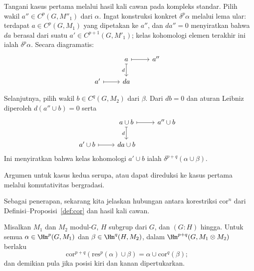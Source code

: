 \begin{bukti}
	Tangani kasus pertama melalui hasil kali cawan pada kompleks standar. Pilih
	wakil $a''\in C^p(G,M''_1)$ dari $\alpha$. Ingat konstruksi konkret
	$\delta^p\alpha$ melalui lema ular: terdapat $a\in C^p(G,M_1)$ yang
	dipetakan ke $a''$, dan $da''=0$ menyiratkan bahwa $da$ berasal dari suatu
	$a'\in C^{p+1}(G,M'_1)$; kelas kohomologi elemen terakhir ini ialah
	$\delta^p\alpha$. Secara diagramatis:
	\[\begin{tikzcd}
		& a \arrow[mapsto, r] \arrow[mapsto, d, "d"'] & a'' \\
		a' \arrow[mapsto, r] & da &
	\end{tikzcd}\]

	Selanjutnya, pilih wakil $b\in C^q(G,M_2)$ dari $\beta$. Dari $db=0$ dan
	aturan Leibniz diperoleh $d(a''\cup b)=0$ serta
	\[\begin{tikzcd}
		& a \cup b \arrow[mapsto, r] \arrow[mapsto, d, "d"'] & a'' \cup b \\
		a' \cup b \arrow[mapsto, r] & da \cup b &
	\end{tikzcd}\]
	Ini menyiratkan bahwa kelas kohomologi $a'\cup b$ ialah
	$\delta^{p+q}(\alpha\cup\beta)$.

	Argumen untuk kasus kedua serupa, atau dapat direduksi ke kasus pertama
	melalui komutativitas bergradasi.
\end{bukti}

Sebagai penerapan, sekarang kita jelaskan hubungan antara korestriksi
$\mathrm{cor}^n$ dari Definisi--Proposisi~\ref{def:cor} dan hasil kali cawan.

\begin{proposisi}
	Misalkan $M_1$ dan $M_2$ modul-$G$, $H$ subgrup dari $G$, dan $(G:H)$
	hingga. Untuk semua $\alpha\in\Hm^p(G,M_1)$ dan
	$\beta\in\Hm^q(H,M_2)$, dalam $\Hm^{p+q}(G,M_1\otimes M_2)$ berlaku
	\begin{equation*}
		\mathrm{cor}^{p+q}(\mathrm{res}^p(\alpha) \cup \beta) = \alpha \cup \mathrm{cor}^q(\beta);
	\end{equation*}
	dan demikian pula jika posisi kiri dan kanan dipertukarkan.
\end{proposisi}


